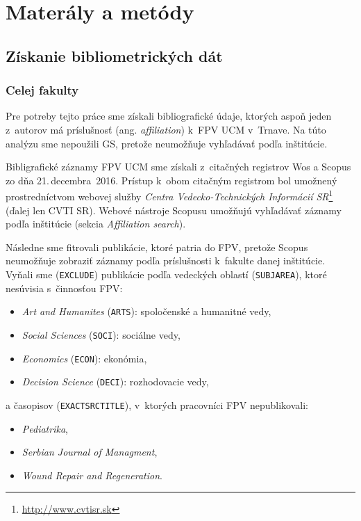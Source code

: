 \chapter{Materály a metódy}

\section{Získanie bibliometrických dát}

\subsection{Celej fakulty}
\label{sec.all.mining}

Pre potreby tejto práce sme získali bibliografické údaje, ktorých aspoň jeden
z~autorov má príslušnosť (ang. \emph{affiliation}) k~FPV UCM v~Trnave. Na túto
analýzu sme nepoužili GS, pretože neumožňuje vyhľadávať podľa inštitúcie.

Bibligrafické záznamy FPV UCM sme získali z~citačných registrov
Wos a Scopus zo dňa 21.\,decembra~2016.  Prístup k~obom citačným registrom bol
umožnený prostredníctvom webovej služby \emph{Centra Vedecko-Technických
Informácií SR}\footnote{\url{http://www.cvtisr.sk}} (ďalej len CVTI SR).  Webové nástroje Scopusu
umožňujú vyhľadávať záznamy podľa inštitúcie (sekcia \emph{Affiliation search}).

Následne sme fitrovali publikácie, ktoré patria do FPV, pretože Scopus
neumožňuje zobraziť záznamy podľa príslušnosti k~fakulte danej inštitúcie.
Vyňali sme (\texttt{EXCLUDE}) publikácie podľa vedeckých oblastí
(\texttt{SUBJAREA}), ktoré nesúvisia s~činnosťou FPV:

\begin{itemize}
  \item \emph{Art and Humanites} (\texttt{ARTS}): spoločenské a humanitné vedy,
  \item \emph{Social Sciences} (\texttt{SOCI}): sociálne vedy,
  \item \emph{Economics} (\texttt{ECON}): ekonómia,
  \item \emph{Decision Science} (\texttt{DECI}): rozhodovacie vedy,
\end{itemize}
a časopisov (\texttt{EXACTSRCTITLE}), v~ktorých pracovníci FPV nepublikovali:

\begin{itemize}
  \item \emph{Pediatrika}, 
  \item \emph{Serbian Journal of Managment}, 
  \item \emph{Wound Repair and Regeneration}.
\end{itemize}

